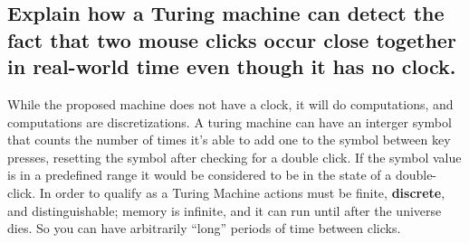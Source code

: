 \documentclass{article}
\begin{document}
\subsection[Turing Machine Double Click]{Explain how a Turing machine can 
detect the fact that two mouse clicks occur close together in real-world time 
even though it has no clock.}
While the proposed machine does not have a clock, it will do computations, and 
computations are discretizations. A turing machine can have an interger symbol 
that counts the number of times it's able to add one to the symbol between key 
presses, resetting the symbol after checking for a double click. If the symbol 
value is in a predefined range it would be considered to be in the state of a 
double-click. In order to qualify as a Turing Machine actions must be finite, 
\textbf{discrete}, and distinguishable; memory is infinite, and it can run 
until after the universe dies. So you can have arbitrarily ``long'' periods of 
time between clicks.
\end{document}
